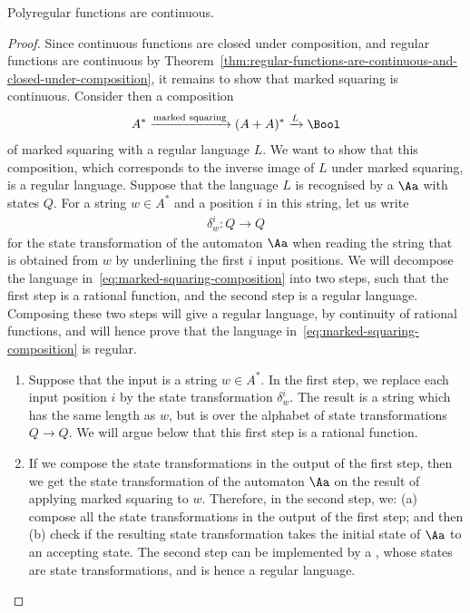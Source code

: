 \begin{theorem}\label{thm:polyregular-functions-are-continuous}
    Polyregular functions are continuous.
\end{theorem}
\begin{proof}
    Since continuous functions are closed under composition, and regular functions are continuous by Theorem~\ref{thm:regular-functions-are-continuous-and-closed-under-composition}, it remains to show that marked squaring is continuous. Consider then a composition 
    \begin{align}\label{eq:marked-squaring-composition}
    A^* \xrightarrow{\text{marked squaring}} (A+A)^* \xrightarrow L \Bool
    \end{align}
    of marked squaring with a regular language $L$. We want to show that this composition, which corresponds to the inverse image of $L$ under marked squaring, is a regular language. Suppose that the language $L$ is recognised by a \dfa  $\Aa$ with states $Q$.     For a string $w  \in A^*$ and a position $i$ in this string, let us write
    \begin{align*}
    \delta_w^i : Q \to Q
    \end{align*}
    for the state transformation of the automaton $\Aa$ when reading the string that is obtained from $w$ by underlining the first $i$  input positions.  We will decompose the language in~\eqref{eq:marked-squaring-composition} into two steps, such that the first step is a rational function, and the second step is a regular language. Composing these two steps will give a regular language, by continuity of rational functions, and will hence prove that the language in~\eqref{eq:marked-squaring-composition} is regular. 
    \begin{enumerate}
        \item Suppose that the input is a string $w \in A^*$.  In the first step, we replace each input position $i$ by the state transformation $\delta_w^i$. The result is a string which has the same length as $w$, but is over the alphabet of state transformations $Q \to Q$. We will argue below that this first step is a rational function.

        \item If we compose the state transformations in the output of the first step, then we get the state transformation of the automaton $\Aa$ on the result of applying marked squaring to $w$. Therefore, in the second step, we: (a) compose all the state transformations in the output of the first step; and then  (b) check if the resulting state transformation takes the initial state of $\Aa$ to an accepting state. The second step can be implemented by a \dfa, whose states are state transformations, and is hence a regular language. 
    \end{enumerate}


\end{proof}
